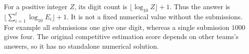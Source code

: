 For a positive integer $Z$, its digit count is $\lfloor\log_{10}Z\rfloor+1$. Thus the answer is $\boxed{\lfloor\sum_{i=1}^t\log_{10}E_i\rfloor+1}$. It is not a fixed numerical value without the submissions. For example all submissions one give one digit, whereas a single submission $1000$ gives four. The original competitive estimation score depends on other teams's answers, so it has no standalone numerical solution.

